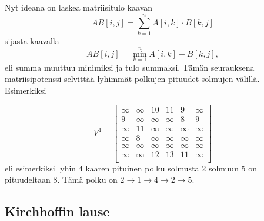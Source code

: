 Nyt ideana on laskea matriisitulo kaavan
\[
AB[i,j] = \sum_{k=1}^n A[i,k] \cdot B[k,j]
\]
sijasta kaavalla
\[
AB[i,j] = \min_{k=1}^n A[i,k] + B[k,j],
\]
eli summa muuttuu minimiksi ja tulo summaksi.
Tämän seurauksena matriisipotenssi
selvittää lyhimmät polkujen pituudet solmujen
välillä. Esimerkiksi

\[
V^4= \begin{bmatrix}
  \infty & \infty & 10 & 11 & 9 & \infty \\
  9 & \infty & \infty & \infty & 8 & 9 \\
  \infty & 11 & \infty & \infty & \infty & \infty \\
  \infty & 8 & \infty & \infty & \infty & \infty \\
  \infty & \infty & \infty & \infty & \infty & \infty \\
  \infty & \infty & 12 & 13 & 11 & \infty \\
 \end{bmatrix}
\]
eli esimerkiksi lyhin 4 kaaren pituinen polku
solmusta 2 solmuun 5 on pituudeltaan 8.
Tämä polku on $2 \rightarrow 1 \rightarrow 4 \rightarrow 2 \rightarrow 5$.


\subsection{Kirchhoffin lause}



